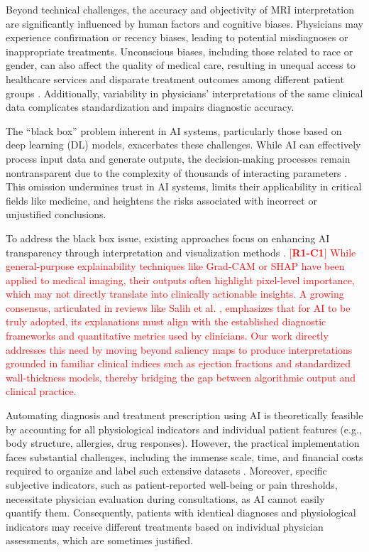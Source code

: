 \documentclass[fleqn,10pt]{wlscirep}
\newcommand{\revtag}[2]{[\textbf{R#1-C#2}]}
\newcommand{\Rone}[1]{\textcolor{red}{#1}}
\begin{document}
Beyond technical challenges, the accuracy and objectivity of MRI interpretation are significantly influenced by human factors and cognitive biases. Physicians may experience confirmation or recency biases, leading to potential misdiagnoses or inappropriate treatments. Unconscious biases, including those related to race or gender, can also affect the quality of medical care, resulting in unequal access to healthcare services and disparate treatment outcomes among different patient groups \cite{DeBenedectis:2022,Meidert:2023}. Additionally, variability in physicians' interpretations of the same clinical data complicates standardization and impairs diagnostic accuracy.

The ``black box'' problem inherent in AI systems, particularly those based on deep learning (DL) models, exacerbates these challenges. While AI can effectively process input data and generate outputs, the decision-making processes remain nontransparent due to the complexity of thousands of interacting parameters \cite{Radiuk:2024a}. This omission undermines trust in AI systems, limits their applicability in critical fields like medicine, and heightens the risks associated with incorrect or unjustified conclusions.

To address the black box issue, existing approaches focus on enhancing AI transparency through interpretation and visualization methods \cite{Shick:2024}. \Rone{\revtag{1}{1} While general-purpose explainability techniques like Grad-CAM or SHAP have been applied to medical imaging, their outputs often highlight pixel-level importance, which may not directly translate into clinically actionable insights. A growing consensus, articulated in reviews like Salih et al. \cite{Salih:2023}, emphasizes that for AI to be truly adopted, its explanations must align with the established diagnostic frameworks and quantitative metrics used by clinicians. Our work directly addresses this need by moving beyond saliency maps to produce interpretations grounded in familiar clinical indices such as ejection fractions and standardized wall-thickness models, thereby bridging the gap between algorithmic output and clinical practice.}

Automating diagnosis and treatment prescription using AI is theoretically feasible by accounting for all physiological indicators and individual patient features (e.g., body structure, allergies, drug responses). However, the practical implementation faces substantial challenges, including the immense scale, time, and financial costs required to organize and label such extensive datasets \cite{Radiuk:2021}. Moreover, specific subjective indicators, such as patient-reported well-being or pain thresholds, necessitate physician evaluation during consultations, as AI cannot easily quantify them. Consequently, patients with identical diagnoses and physiological indicators may receive different treatments based on individual physician assessments, which are sometimes justified.
\end{document}
